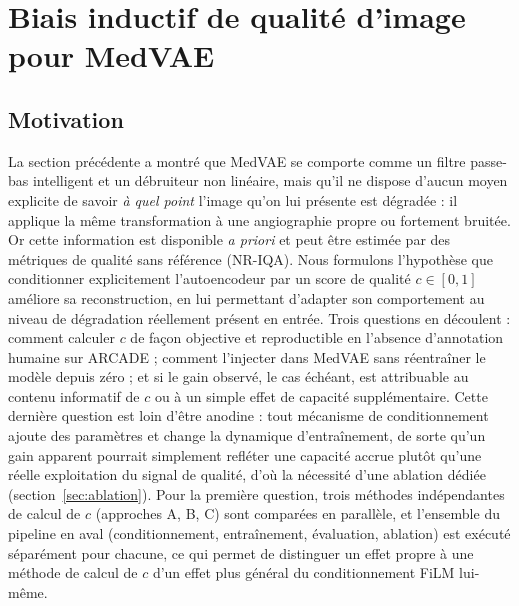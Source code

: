 \documentclass[conference]{IEEEtran}
\begin{document}
\pagestyle{plain}

\section{Biais inductif de qualité d'image pour MedVAE}
\label{sec:theophile}

\subsection{Motivation}

La section précédente a montré que MedVAE se comporte comme un filtre
passe-bas intelligent et un débruiteur non linéaire, mais qu'il ne dispose
d'aucun moyen explicite de savoir \emph{à quel point} l'image qu'on lui
présente est dégradée : il applique la même transformation à une
angiographie propre ou fortement bruitée. Or cette information est
disponible \emph{a priori} et peut être estimée par des métriques de
qualité sans référence (NR-IQA). Nous formulons l'hypothèse que
conditionner explicitement l'autoencodeur par un score de qualité
$c \in [0,1]$ améliore sa reconstruction, en lui permettant d'adapter son
comportement au niveau de dégradation réellement présent en entrée. Trois
questions en découlent : comment calculer $c$ de façon objective et
reproductible en l'absence d'annotation humaine sur ARCADE ; comment
l'injecter dans MedVAE sans réentraîner le modèle depuis zéro ; et si le
gain observé, le cas échéant, est attribuable au contenu informatif de $c$
ou à un simple effet de capacité supplémentaire. Cette dernière question est
loin d'être anodine : tout mécanisme de conditionnement ajoute des
paramètres et change la dynamique d'entraînement, de sorte qu'un gain
apparent pourrait simplement refléter une capacité accrue plutôt qu'une
réelle exploitation du signal de qualité, d'où la nécessité d'une ablation
dédiée (section~\ref{sec:ablation}). Pour la première question, trois
méthodes indépendantes de calcul de $c$ (approches A, B, C)
sont comparées en parallèle, et l'ensemble du pipeline en aval
(conditionnement, entraînement, évaluation, ablation) est exécuté
séparément pour chacune,
ce qui permet de distinguer un effet propre à une méthode de calcul de $c$
d'un effet plus général du conditionnement FiLM lui-même.
\end{document}
